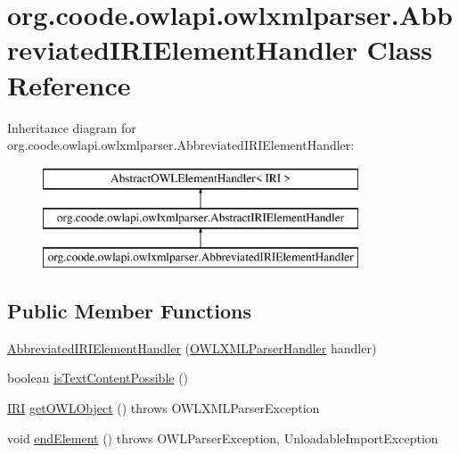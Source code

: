 \hypertarget{classorg_1_1coode_1_1owlapi_1_1owlxmlparser_1_1_abbreviated_i_r_i_element_handler}{\section{org.\-coode.\-owlapi.\-owlxmlparser.\-Abbreviated\-I\-R\-I\-Element\-Handler Class Reference}
\label{classorg_1_1coode_1_1owlapi_1_1owlxmlparser_1_1_abbreviated_i_r_i_element_handler}
}
Inheritance diagram for org.\-coode.\-owlapi.\-owlxmlparser.\-Abbreviated\-I\-R\-I\-Element\-Handler\-:\begin{figure}[H]
\begin{center}
\leavevmode
\includegraphics[height=3.000000cm]{classorg_1_1coode_1_1owlapi_1_1owlxmlparser_1_1_abbreviated_i_r_i_element_handler}
\end{center}
\end{figure}
\subsection*{Public Member Functions}
\begin{DoxyCompactItemize}
\item 
\hyperlink{classorg_1_1coode_1_1owlapi_1_1owlxmlparser_1_1_abbreviated_i_r_i_element_handler_acddf1f864da4abba05852bf41281bb14}{Abbreviated\-I\-R\-I\-Element\-Handler} (\hyperlink{classorg_1_1coode_1_1owlapi_1_1owlxmlparser_1_1_o_w_l_x_m_l_parser_handler}{O\-W\-L\-X\-M\-L\-Parser\-Handler} handler)
\item 
boolean \hyperlink{classorg_1_1coode_1_1owlapi_1_1owlxmlparser_1_1_abbreviated_i_r_i_element_handler_a238354c7eed9e5b01392aaece45db7cc}{is\-Text\-Content\-Possible} ()
\item 
\hyperlink{classorg_1_1semanticweb_1_1owlapi_1_1model_1_1_i_r_i}{I\-R\-I} \hyperlink{classorg_1_1coode_1_1owlapi_1_1owlxmlparser_1_1_abbreviated_i_r_i_element_handler_a789c6820f2a22ad1744dcdc75764bc49}{get\-O\-W\-L\-Object} ()  throws O\-W\-L\-X\-M\-L\-Parser\-Exception 
\item 
void \hyperlink{classorg_1_1coode_1_1owlapi_1_1owlxmlparser_1_1_abbreviated_i_r_i_element_handler_a7de09b289de6e67240d6e3d44a5e6ae6}{end\-Element} ()  throws O\-W\-L\-Parser\-Exception, Unloadable\-Import\-Exception 
\end{DoxyCompactItemize}
